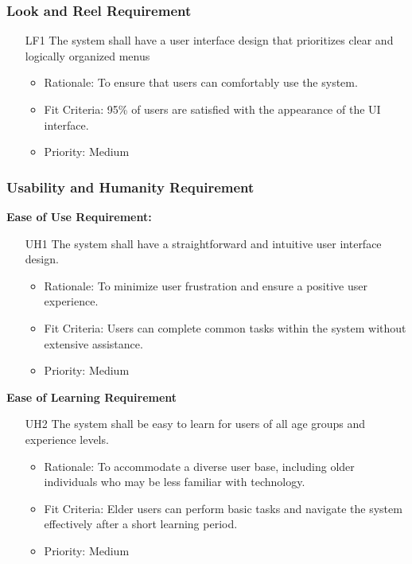 \documentclass[12pt]{article}
\begin{document}
\subsubsection{Look and Reel Requirement}
\begin{itemize}
    \item[LF1] The system shall have a user interface design that prioritizes clear and logically organized menus \label{LF1}
    \begin{itemize}
        \item Rationale: To ensure that users can comfortably use the system.
        \item Fit Criteria: 95\% of users are satisfied with the appearance of the UI interface.
        \item Priority: Medium
    \end{itemize}
\end{itemize}
\subsubsection{Usability and Humanity Requirement}
\textbf{Ease of Use Requirement:}
\begin{itemize}
    \item[UH1] The system shall have a straightforward and intuitive user interface design. \label{UH1}
    \begin{itemize}
        \item Rationale: To minimize user frustration and ensure a positive user experience.
        \item Fit Criteria: Users can complete common tasks within the system without extensive assistance.
        \item Priority: Medium
    \end{itemize}
\end{itemize}
\textbf{Ease of Learning Requirement}
\begin{itemize}
    \item[UH2] The system shall be easy to learn for users of all age groups and experience levels. \label{UH2}
    \begin{itemize}
        \item Rationale: To accommodate a diverse user base, including older individuals who may be less familiar with technology.
        \item Fit Criteria: Elder users can perform basic tasks and navigate the system effectively after a short learning period.
        \item Priority: Medium
    \end{itemize}
\end{itemize}
\end{document}
